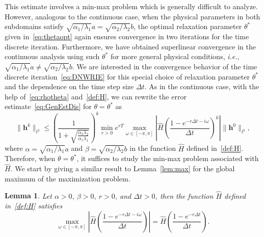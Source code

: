 \documentclass[10pt,a4paper]{amsart}
\newtheorem{lemma}{Lemma}
\begin{document}
This estimate involves a min-max problem which is generally difficult to analyze. However, analogous to the continuous case, when the physical parameters in both subdomains satisfy $\sqrt{\alpha_1/\lambda_1}a = \sqrt{\alpha_2/\lambda_2}b$, the optimal relaxation parameter $\theta^*$ given in~\eqref{eq:thetaopt} again ensures convergence in two iterations for the time discrete iteration. Furthermore, we have obtained superlinear convergence in the continuous analysis using such $\theta^*$ for more general physical conditions, {\it i.e.}, $\sqrt{\alpha_1/\lambda_1}a \neq \sqrt{\alpha_2/\lambda_2}b$. We are interested in the convergence behavior of the time discrete iteration~\eqref{eq:DNWRIE} for this special choice of relaxation parameter $\theta^*$ and the dependence on the time step size $\Delta t$.
As in the continuous case, with the help of~\eqref{eq:rhotheta} and~\eqref{def:H}, we can rewrite the error estimate~\eqref{eq:GenEstDis} for $\theta=\theta^*$ as
\begin{equation}\label{eq:SpeEstDis}
\|\boldsymbol{h}^k\|_{l^2} \leq \left(\frac{1}{1+\sqrt{\frac{\alpha_2\lambda_2}{\alpha_1\lambda_1}}}\right)^k \min_{r > 0} e^{rT}\max_{\omega \in [-\pi,\pi]} \left|\hat H\left(\frac{1-e^{-r \Delta t -i \omega}}{\Delta t}\right)^k\right| \|\boldsymbol{h}^0\|_{l^2},
\end{equation} 
where $\alpha = \sqrt{\alpha_1/\lambda_1} a$ and $\beta = \sqrt{\alpha_2/\lambda_2} b$ in the function $\hat H$ defined in~\eqref{def:H}. Therefore, when $\theta=\theta^*$, it suffices to study the min-max problem associated with $\hat H$. We start by giving a similar result to Lemma~\ref{lem:max} for the global maximum of the maximization problem. 

\begin{lemma}\label{lem:maxDisc}
Let $\alpha> 0$, $\beta>0$, $r>0$, and $\Delta t>0$, then the function $\hat{H}$ defined in~\eqref{def:H} satisfies 
\[\max_{\omega \in [-\pi,\pi]} \left| \hat{H} \left(\frac{1-e^{-r \Delta t - i \omega}}{\Delta t}\right) \right| 
= \hat{H} \left(\frac{1-e^{-r \Delta t}}{\Delta t}\right).\]
\end{lemma}
\end{document}
